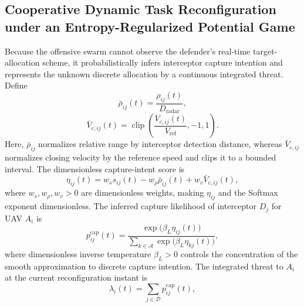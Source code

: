 \documentclass{cja}
\begin{document}
\subsection{Cooperative Dynamic Task Reconfiguration under an Entropy-Regularized Potential Game}

Because the offensive swarm cannot observe the defender's real-time target-allocation scheme, it probabilistically infers interceptor capture intention and represents the unknown discrete allocation by a continuous integrated threat. Define
\begin{equation}
\bar\rho_{ij}(t)
=
\frac{\rho_{ij}(t)}{D_{\mathrm{radar}}},
\end{equation}
\begin{equation}
\bar V_{c,ij}(t)
=
\operatorname{clip}\!\left(
\frac{V_{c,ij}(t)}{V_{\mathrm{ref}}},
-1,1
\right).
\end{equation}
Here, $\bar\rho_{ij}$ normalizes relative range by interceptor detection distance, whereas $\bar V_{c,ij}$ normalizes closing velocity by the reference speed and clips it to a bounded interval. The dimensionless capture-intent score is
\begin{equation}
\eta_{ij}(t)
=
w_s s_{ij}(t)
-
w_{\rho}\bar\rho_{ij}(t)
+
w_v \bar V_{c,ij}(t),
\end{equation}
where $w_s,w_{\rho},w_v>0$ are dimensionless weights, making $\eta_{ij}$ and the Softmax exponent dimensionless. The inferred capture likelihood of interceptor $D_j$ for UAV $A_i$ is
\begin{equation}
p_{ij}^{\mathrm{cap}}(t)
=
\frac{\exp\!\bigl(\beta_L \eta_{ij}(t)\bigr)}
{\sum\limits_{k\in\mathcal{A}}\exp\!\bigl(\beta_L \eta_{kj}(t)\bigr)},
\label{eq:soft-lock-prob}
\end{equation}
where dimensionless inverse temperature $\beta_L>0$ controls the concentration of the smooth approximation to discrete capture intention. The integrated threat to $A_i$ at the current reconfiguration instant is
\begin{equation}
\lambda_i(t)
=
\sum_{j\in\mathcal D}p_{ij}^{\mathrm{cap}}(t),
\label{eq:soft-lock-pressure}
\end{equation}
\end{document}
